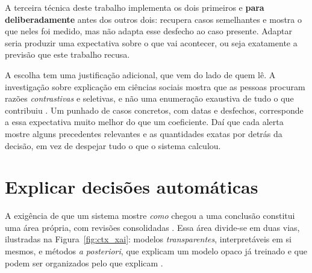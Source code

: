 A terceira técnica deste trabalho implementa os dois primeiros e \textbf{para deliberadamente} antes
dos outros dois: recupera casos semelhantes e mostra o que neles foi medido, mas não adapta esse
desfecho ao caso presente. Adaptar seria produzir uma expectativa sobre o que vai acontecer, ou seja
exatamente a previsão que este trabalho recusa.

A escolha tem uma justificação adicional, que vem do lado de quem lê. A investigação sobre explicação
em ciências sociais mostra que as pessoas procuram razões \emph{contrastivas} e seletivas, e não uma
enumeração exaustiva de tudo o que contribuiu \autocite{miller2019explanation}. Um punhado de casos
concretos, com datas e desfechos, corresponde a essa expectativa muito melhor do que um coeficiente.
Daí que cada alerta mostre alguns precedentes relevantes e as quantidades exatas por detrás da
decisão, em vez de despejar tudo o que o sistema calculou.

\section{Explicar decisões automáticas}
\label{sec:ctx_xai}

A exigência de que um sistema mostre \emph{como} chegou a uma conclusão constitui uma área própria,
com revisões consolidadas \autocite{arrieta2020xai, adadi2018peeking}. Essa área divide-se em duas
vias, ilustradas na Figura~\ref{fig:ctx_xai}: modelos
\emph{transparentes}, interpretáveis em si mesmos, e métodos \emph{a posteriori}, que explicam um
modelo opaco já treinado e que podem ser organizados pelo que explicam
\autocite{guidotti2018survey}.

